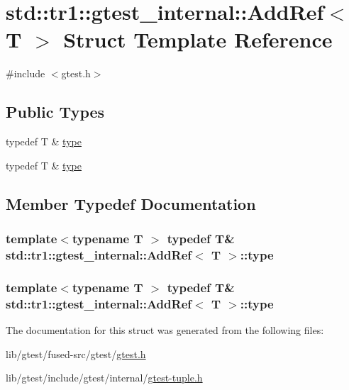 \hypertarget{structstd_1_1tr1_1_1gtest__internal_1_1_add_ref}{\section{std\-:\-:tr1\-:\-:gtest\-\_\-internal\-:\-:Add\-Ref$<$ T $>$ Struct Template Reference}
\label{structstd_1_1tr1_1_1gtest__internal_1_1_add_ref}
}


{\ttfamily \#include $<$gtest.\-h$>$}

\subsection*{Public Types}
\begin{DoxyCompactItemize}
\item 
typedef T \& \hyperlink{structstd_1_1tr1_1_1gtest__internal_1_1_add_ref_a1e5616e414125574c1653e3a1fc68491}{type}
\item 
typedef T \& \hyperlink{structstd_1_1tr1_1_1gtest__internal_1_1_add_ref_a1e5616e414125574c1653e3a1fc68491}{type}
\end{DoxyCompactItemize}


\subsection{Member Typedef Documentation}
\hypertarget{structstd_1_1tr1_1_1gtest__internal_1_1_add_ref_a1e5616e414125574c1653e3a1fc68491}{
\subsubsection[{type}]{\setlength{\rightskip}{0pt plus 5cm}template$<$typename T $>$ typedef T\& {\bf std\-::tr1\-::gtest\-\_\-internal\-::\-Add\-Ref}$<$ T $>$\-::{\bf type}}}\label{structstd_1_1tr1_1_1gtest__internal_1_1_add_ref_a1e5616e414125574c1653e3a1fc68491}
\hypertarget{structstd_1_1tr1_1_1gtest__internal_1_1_add_ref_a1e5616e414125574c1653e3a1fc68491}{
\subsubsection[{type}]{\setlength{\rightskip}{0pt plus 5cm}template$<$typename T $>$ typedef T\& {\bf std\-::tr1\-::gtest\-\_\-internal\-::\-Add\-Ref}$<$ T $>$\-::{\bf type}}}\label{structstd_1_1tr1_1_1gtest__internal_1_1_add_ref_a1e5616e414125574c1653e3a1fc68491}


The documentation for this struct was generated from the following files\-:\begin{DoxyCompactItemize}
\item 
lib/gtest/fused-\/src/gtest/\hyperlink{fused-src_2gtest_2gtest_8h}{gtest.\-h}\item 
lib/gtest/include/gtest/internal/\hyperlink{gtest-tuple_8h}{gtest-\/tuple.\-h}\end{DoxyCompactItemize}
